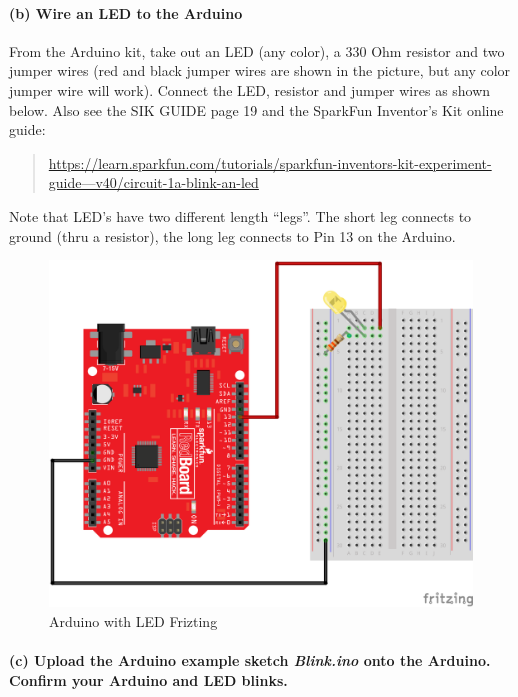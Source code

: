     \hypertarget{b-wire-an-led-to-the-arduino}{%
\paragraph{(b) Wire an LED to the
Arduino}\label{b-wire-an-led-to-the-arduino}}

From the Arduino kit, take out an LED (any color), a 330 Ohm resistor
and two jumper wires (red and black jumper wires are shown in the
picture, but any color jumper wire will work). Connect the LED, resistor
and jumper wires as shown below. Also see the SIK GUIDE page 19 and the
SparkFun Inventor's Kit online guide:

\begin{quote}
\href{https://learn.sparkfun.com/tutorials/sparkfun-inventors-kit-experiment-guide---v40/circuit-1a-blink-an-led}{https://learn.sparkfun.com/tutorials/sparkfun-inventors-kit-experiment-guide---v40/circuit-1a-blink-an-led}
\end{quote}

Note that LED's have two different length ``legs''. The short leg
connects to ground (thru a resistor), the long leg connects to Pin 13 on
the Arduino.

\begin{figure}[h!]
\centering
\includegraphics{images/Arduino_LED_fritzing.png}
\caption{Arduino with LED Frizting}
\end{figure}

    \hypertarget{c-upload-the-arduino-example-sketch-blink.ino-onto-the-arduino.-confirm-your-arduino-and-led-blinks.}{%
\paragraph{\texorpdfstring{(c) Upload the Arduino example sketch
\textbf{\emph{Blink.ino}} onto the Arduino. Confirm your Arduino and LED
blinks.}{(c) Upload the Arduino example sketch Blink.ino onto the Arduino. Confirm your Arduino and LED blinks.}}\label{c-upload-the-arduino-example-sketch-blink.ino-onto-the-arduino.-confirm-your-arduino-and-led-blinks.}}

